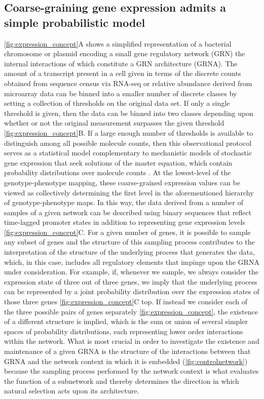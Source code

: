 \subsection{Coarse-graining gene expression admits a simple probabilistic model}
\ref{fig:expression_concept}A shows a simplified representation of a bacterial chromosome or plasmid encoding a small gene regulatory network (GRN) the internal interactions of which constitute a GRN architecture (GRNA). The amount of a transcript present in a cell given in terms of the discrete counts obtained from sequence census via RNA-seq or relative abundance derived from microarray data can be binned into a smaller number of discrete classes by setting a collection of thresholds on the original data set. If only a single threshold is given, then the data can be binned into two classes depending upon whether or not the original measurement surpasses the given threshold \ref{fig:expression_concept}B. If a large enough number of thresholds is available to distinguish among all possible molecule counts, then this observational protocol serves as a statistical model complementary to mechanistic models of stochastic gene expression that seek solutions of the master equation, which contain probability distributions over molecule counts \cite{Walczak2009,Mugler2009}. At the lowest-level of the genotype-phenotype mapping, these coarse-grained expression values can be viewed as collectively determining the first level in the aforementioned hierarchy of genotype-phenotype maps. In this way, the data derived from a number of samples of a given network can be described using binary sequences that reflect time-lagged promoter states in addition to representing gene expression levels \ref{fig:expression_concept}C. For a given number of genes, it is possible to sample any subset of genes and the structure of this sampling process contributes to the interpretation of the structure of the underlying process that generates the data, which, in this case, includes all regulatory elements that impinge upon the GRNA under consideration. For example, if, whenever we sample, we always consider the expression state of three out of three genes, we imply that the underlying process can be represented by a joint probability distribution over the expression states of those three genes \ref{fig:expression_concept}C top. If instead we consider each of the three possible pairs of genes separately \ref{fig:expression_concept}, the existence of a different structure is implied, which is the sum or union of several simpler spaces of probability distributions, each representing lower order interactions within the network. What is most crucial in order to investigate the existence and maintenance of a given GRNA is the structure of the interactions between that GRNA and the network context in which it is embedded (\ref{fig:controlnetwork}) because the sampling process performed by the network context is what evaluates the function of a subnetwork and thereby determines the direction in which natural selection acts upon its architecture.

